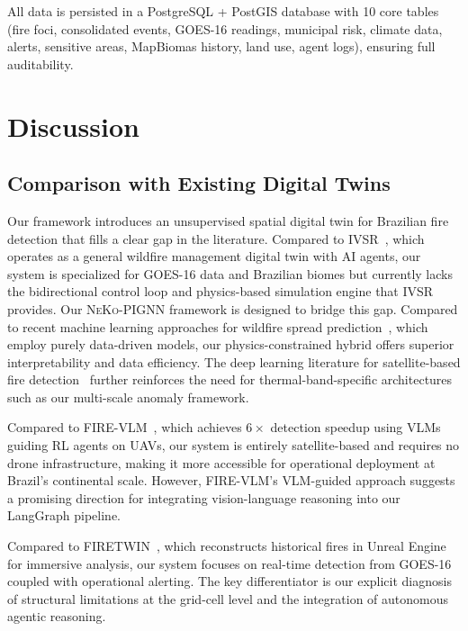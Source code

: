 \documentclass[11pt,twocolumn,a4paper]{article}
\newcommand{\abbrev}[1]{{\small\textsc{#1}}}
\begin{document}
All data is persisted in a PostgreSQL + PostGIS database with 10 core tables (fire foci, consolidated events, GOES-16 readings, municipal risk, climate data, alerts, sensitive areas, MapBiomas history, land use, agent logs), ensuring full auditability.

\section{Discussion}
\label{sec:discussion}

\subsection{Comparison with Existing Digital Twins}

Our framework introduces an unsupervised spatial digital twin for Brazilian fire detection that fills a clear gap in the literature. Compared to \abbrev{IVSR}~\cite{morsali2026}, which operates as a general wildfire management digital twin with \abbrev{AI} agents, our system is specialized for \abbrev{GOES-16} data and Brazilian biomes but currently lacks the bidirectional control loop and physics-based simulation engine that \abbrev{IVSR} provides. Our \abbrev{NeKo-PIGNN} framework is designed to bridge this gap. Compared to recent machine learning approaches for wildfire spread prediction~\cite{schmidt2025_fires,chowdhury2023_wildfire,de2023_cnn}, which employ purely data-driven models, our physics-constrained hybrid offers superior interpretability and data efficiency. The deep learning literature for satellite-based fire detection~\cite{ba2022_wildfire} further reinforces the need for thermal-band-specific architectures such as our multi-scale anomaly framework.

Compared to \abbrev{FIRE-VLM}~\cite{webb2026}, which achieves $6\times$ detection speedup using \abbrev{VLM}s guiding \abbrev{RL} agents on \abbrev{UAV}s, our system is entirely satellite-based and requires no drone infrastructure, making it more accessible for operational deployment at Brazil's continental scale. However, \abbrev{FIRE-VLM}'s \abbrev{VLM}-guided approach suggests a promising direction for integrating vision-language reasoning into our LangGraph pipeline.

Compared to \abbrev{FIRETWIN}~\cite{raha2025}, which reconstructs historical fires in Unreal Engine for immersive analysis, our system focuses on real-time detection from \abbrev{GOES-16} coupled with operational alerting. The key differentiator is our explicit diagnosis of structural limitations at the grid-cell level and the integration of autonomous agentic reasoning.
\end{document}
